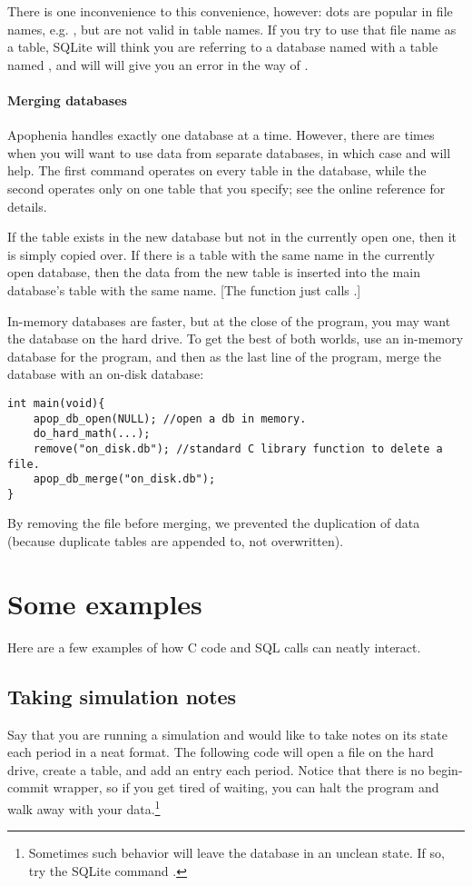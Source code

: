 There is one inconvenience to this convenience, however: dots are popular
in file names, e.g. , but are not valid in table names. If
you try to use that file name as a table, SQLite will think you are
referring to a database named  with a table named ,
and will will give you an error in the way of .

\paragraph{Merging databases} Apophenia handles exactly one database at
a time. However, there are times when you will want to use data
from separate databases, in which case  and
 will help.  The first command
operates on every table in the database, while the second operates only
on one table that you specify; see the online reference for details.

If the table exists in the new database but not in the currently open
one, then it is simply copied over. If there is a table with the same
name in the currently open database, then the data from the new table is
inserted into the main database's table with the same name. [The function
just calls .]

In-memory databases are faster, but at the close of the program, you
may want the database on the hard drive. To get the best of both
worlds, use an in-memory database for the program, and then as the last
line of the program, merge the database with an on-disk database:
\begin{lstlisting}
int main(void){
    apop_db_open(NULL); //open a db in memory.
    do_hard_math(...);
    remove("on_disk.db"); //standard C library function to delete a file.
    apop_db_merge("on_disk.db");
}
\end{lstlisting}
By removing the file before merging, we prevented the duplication of
data (because duplicate tables are appended to, not overwritten).

\section{Some examples} 
Here are a few examples of how C code and SQL calls can neatly interact.

\subsection{Taking simulation notes}\label{createeg}
Say that you are running a simulation and would like to take notes on
its state each period in a neat format. The following code will open a
file on the hard drive, create a table, and add an entry each period.
Notice that there is no begin-commit wrapper, so if you get tired of
waiting, you can halt the program and walk away with
your data.\footnote{Sometimes such behavior will leave the database in
an unclean state. If so, try the SQLite command .}


